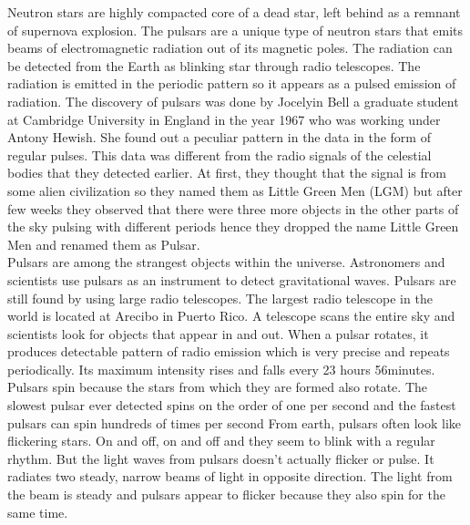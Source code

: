 \hspace{0.6cm}Neutron stars are highly compacted core of a dead star, left behind as a remnant of supernova explosion. The pulsars are a unique type of neutron stars that emits beams of electromagnetic radiation out of its magnetic poles. The radiation can be detected from the Earth as blinking star through radio telescopes. The radiation is emitted in the periodic pattern so it appears as a pulsed emission of radiation. The discovery of pulsars was done by Jocelyin Bell a graduate student at Cambridge University in England in the year 1967 \cite{AstronomyAndbeyond:1999} who was working under Antony Hewish. She found out a peculiar pattern in the data in the form of regular pulses. This data was different from the radio signals of the celestial bodies that they detected earlier. At first, they thought that the signal is from some alien civilization so they named them as Little Green Men (LGM) but after few weeks they observed that there were three more objects in the other parts of the sky pulsing with different periods hence they dropped the name Little Green Men and renamed them as Pulsar.\\

Pulsars are among the strangest objects within the universe. Astronomers and scientists use pulsars as an instrument to detect gravitational waves. Pulsars are still found by using large radio telescopes. The largest radio telescope in the world is located at Arecibo in Puerto Rico. A telescope scans the entire sky and scientists look for objects that appear in and out. When a pulsar rotates, it produces detectable pattern of radio emission which is very precise and repeats periodically. Its maximum intensity rises and falls every 23 hours 56minutes. Pulsars spin because the stars from which they are formed also rotate. The slowest pulsar ever detected spins on the order of one per second and the fastest pulsars can spin hundreds of times per second From earth, pulsars often look like flickering stars. On and off, on and off and they seem to blink with a regular rhythm. But the light waves from pulsars doesn't actually flicker or pulse. It radiates two steady, narrow beams of light in opposite direction. The light from the beam is steady and pulsars appear to flicker because they also spin for the same time. \cite{AstronomyAndbeyond:1999}\\

